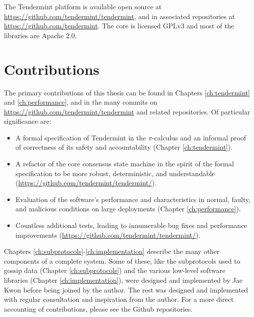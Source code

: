 The Tendermint platform is available open source at \url{https://github.com/tendermint/tendermint}, 
and in associated repositories at \url{https://github.com/tendermint}.
The core is licensed GPLv3 and most of the libraries are Apache 2.0.

\section{Contributions}

The primary contributions of this thesis can be found in Chapters \ref{ch:tendermint} and \ref{ch:performance}, 
and in the many commits on \url{https://github.com/tendermint/tendermint} and related repositories.
Of particular significance are:
\begin{itemize}  
    \item A formal specification of Tendermint in the $\pi$-calculus and 
an informal proof of correctness of its safety and accountability (Chapter \ref{ch:tendermint}).

    \item A refactor of the core consensus state machine in the spirit of the formal specification to be more robust, deterministic, and understandable (\url{https://github.com/tendermint/tendermint/}).

    \item Evaluation of the software's performance and characteristics in normal, faulty, and malicious conditions on large deployments (Chapter \ref{ch:performance}). 

    \item Countless additional tests, leading to innumerable bug fixes and performance improvements (\url{https://github.com/tendermint/tendermint/}).
\end{itemize}

Chapters \ref{ch:subprotocols}-\ref{ch:implementation} describe the many other components of a complete system.
Some of these, like the subprotocols used to gossip data (Chapter \ref{ch:subprotocols}) and the various low-level software libraries (Chapter \ref{ch:implementation}),
were designed and implemented by Jae Kwon before being joined by the author. 
The rest was designed and implemented with regular consultation and inspiration from the author.
For a more direct accounting of contributions, please see the Github repositories.

